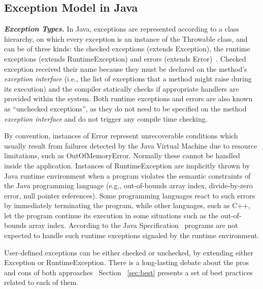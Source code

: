 \documentclass[conference]{IEEEtran}
\begin{document}

\subsection{Exception Model in Java} \label{sec:extypes}

\emph{\textbf{Exception Types.}} In Java, exceptions are represented according to a class hierarchy, on which
 every exception is an instance of the Throwable class, and can be of three kinds: the checked exceptions
(extends Exception), the runtime exceptions (extends RuntimeException) and errors
(extends Error)~\cite{gosling2000java}. Checked exception received their name
 because they must be declared on the method's \emph{exception interface} (i.e., the list of exceptions that a method 
might raise during its execution) and the compiler statically checks if
 appropriate handlers are provided within the system.
Both runtime exceptions and errors are also known as ``unchecked exceptions'', as 
they do not need to be specified on the method \emph{exception interface} and do not trigger any 
compile time checking.

By convention, instances of Error represent  unrecoverable conditions which usually result
from failures detected by the Java Virtual Machine due to resource limitations, such as OutOfMemoryError.
Normally these cannot be handled inside the application.  Instances of RuntimeException are implicitly 
thrown by Java runtime environment when a program violates 
the semantic constraints of the Java programming language (e.g., out-of-bounds array index, divide-by-zero 
error, null pointer references). Some programming languages react to such errors by immediately terminating the program, while
other languages, such as C++, let the program  continue
 its execution in some situations such as the out-of-bounds array index.
According to the Java Specification~\cite{gosling2000java} programs are not 
expected to handle such runtime exceptions signaled by the runtime environment. 

User-defined exceptions can be either checked
 or unchecked, by extending either Exception or RuntimeException. There is a long-lasting debate 
about the pros and cons of both approaches~\cite{javatut,stackoverlow,debate}
Section ~\ref{sec:best} presents
a set of best practices related to each of them.
\end{document}
